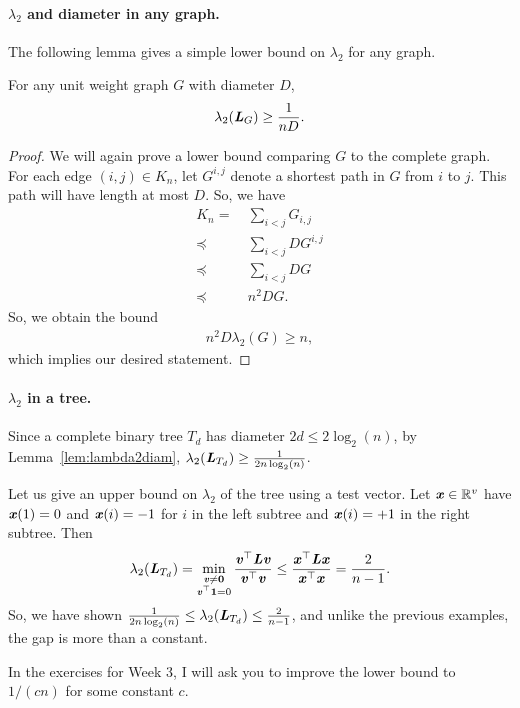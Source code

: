 \paragraph{$\lambda_2$ and diameter in any graph.}
The following lemma gives a simple lower bound on $\lambda_2$ for any
graph.
\begin{lemma}
  \label{lem:lambda2diam}
  For any unit weight graph $G$ with diameter $D$,
  \[
    \lambda_2(\boldsymbol{\mathit{L}}_G) \geq \frac{1}{nD}.
    \]
\end{lemma}
\begin{proof}
  We will again prove a lower bound comparing $G$ to the complete
  graph. For each edge $(i,j) \in K_n$, let $G^{i,j}$ denote a
  shortest path in $G$ from $i$ to $j$. This path will have length at most $D$. So, we have
\begin{align*}
K_n
= & ~ \sum_{i < j} G_{i,j} \\
\preceq & ~ \sum_{i < j} D G^{i,j} \\
\preceq & ~ \sum_{i < j} D G \\
\preceq & ~ n^2 D G.
\end{align*}
So, we obtain the bound
\begin{align*}
n^2D \lambda_{2} (G) \geq n,
\end{align*}
which implies our desired statement.
\end{proof}

\paragraph{$\lambda_2$ in a tree.}
Since a complete binary tree $T_d$ has diameter $2d \leq 2\log_2(n)$,
by Lemma~\ref{lem:lambda2diam}, $\lambda_2(\boldsymbol{\mathit{L}}_{T_d}) \geq
\frac{1}{2n\log_2(n)}$.

Let us give an upper bound on $\lambda_2$ of the tree using a test
vector.
Let $\boldsymbol{\mathit{x}} \in \mathbb{R}^v$ have $\boldsymbol{\mathit{x}}(1) = 0$ and $\boldsymbol{\mathit{x}}(i) = -1$ for $i$ in the left
subtree and $\boldsymbol{\mathit{x}}(i) = +1$ in the right subtree.
Then
\begin{align*}
\lambda_2(\boldsymbol{\mathit{L}}_{T_d}) = \min_{ \substack{ \boldsymbol{\mathit{v}} \neq \boldsymbol{0} \\ \boldsymbol{\mathit{v}}^\top
  \boldsymbol{1} = 0} } \frac{ \boldsymbol{\mathit{v}}^\top \boldsymbol{\mathit{L}} \boldsymbol{\mathit{v}}}{ \boldsymbol{\mathit{v}}^\top \boldsymbol{\mathit{v}}}
  \leq
  \frac{ \boldsymbol{\mathit{x}}^\top \boldsymbol{\mathit{L}} \boldsymbol{\mathit{x}}}{ \boldsymbol{\mathit{x}}^\top \boldsymbol{\mathit{x}}}
  =
  \frac{2}{n-1}.
\end{align*}
So, we have shown
$\frac{1}{2n\log_2(n)} \leq \lambda_2(\boldsymbol{\mathit{L}}_{T_d})
\leq \frac{2}{n-1}$, and unlike the previous examples, the gap is more
than a constant.

In the exercises for Week 3, I will ask you to improve the lower bound to
$1/(cn)$ for some constant $c$.



% 
% 



